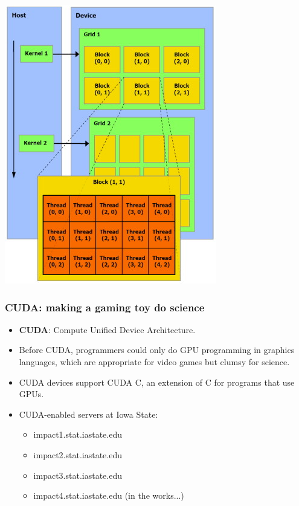 \documentclass[handout]{beamer}
\numberwithin{equation}{section}
\begin{document}
\begin{frame}
\begin{center}
\includegraphics[scale=.7]{../../fig/gridBlocksThreads.jpg}
\end{center}
\end{frame}

\begin{frame}
\frametitle{CUDA: making a gaming toy do science}
\begin{itemize}
\pause \item {\bf CUDA}: Compute Unified Device Architecture. 
\pause \item Before CUDA, programmers could only do GPU programming in graphics languages, which are appropriate for video games but clumsy for science.
\pause \item CUDA devices support CUDA C, an extension of C for programs that use GPUs.
\pause \item CUDA-enabled servers at Iowa State:
\begin{itemize}
\item impact1.stat.iastate.edu
\item impact2.stat.iastate.edu 
\item impact3.stat.iastate.edu 
\item impact4.stat.iastate.edu (in the works...)
\end{itemize}
\end{itemize}
\end{frame}
\end{document}
